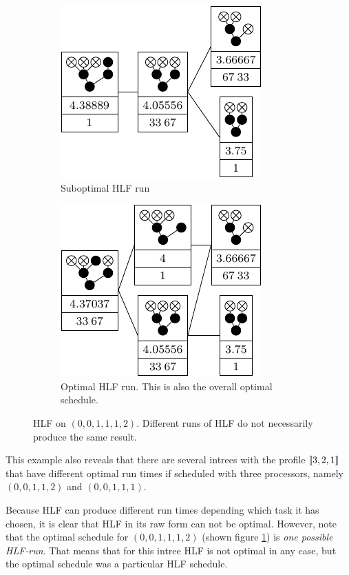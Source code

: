 \begin{figure}[ht]
  \centering
  \begin{subfigure}{.45\linewidth}
    \centering
    \includegraphics{p3/hlf_not_optimal/001112_hlf_subopt.pdf}
    \caption{Suboptimal HLF run}
  \end{subfigure}
  \begin{subfigure}{.45\linewidth}
    \centering
    \includegraphics{p3/hlf_not_optimal/001112_hlf_opt.pdf}
    \caption{Optimal HLF run. This is also the overall optimal schedule.}
    \label{fig:hlf-001112-optimal-version}
  \end{subfigure}
  \caption{HLF on $(0,0,1,1,1,2)$. Different runs of HLF do not necessarily produce the same result.}
  \label{fig:hlf-001112}
\end{figure}

This example also reveals that there are several intrees with the profile $\left\llbracket 3,2,1 \right\rrbracket$ that have different optimal run times if scheduled with three processors, namely $(0,0,1,1,2)$ and $(0,0,1,1,1)$.

Because HLF can produce different run times depending which task it has chosen, it is clear that HLF in its raw form can not be optimal. However, note that the optimal schedule for $(0,0,1,1,1,2)$ (shown figure \ref{fig:hlf-001112-optimal-version}) is \emph{one possible HLF-run}. That means that for this intree HLF is not optimal in any case, but the optimal schedule was a particular HLF schedule.

